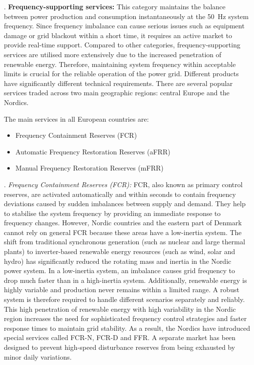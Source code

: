 . \textbf{Frequency-supporting services:} This category maintains the balance between power production and consumption instantaneously at the 50~Hz system frequency. Since frequency imbalance can cause serious issues such as equipment damage or grid blackout within a short time, it requires an active market to provide real-time support. Compared to other categories, frequency-supporting services are utilised more extensively due to the increased penetration of renewable energy. Therefore, maintaining system frequency within acceptable limits is crucial for the reliable operation of the power grid. Different products have significantly different technical requirements. There are several popular services traded across two main geographic regions: central Europe and the Nordics.

The main services in all European countries are:
    \begin{itemize}
        \item Frequency Containment Reserves (FCR)
        \item Automatic Frequency Restoration Reserves (aFRR)
        \item Manual Frequency Restoration Reserves (mFRR)
    \end{itemize}

    . \textit{Frequency Containment Reserves (FCR):} FCR, also known as primary control reserves, are activated automatically and within seconds to contain frequency deviations caused by sudden imbalances between supply and demand. They help to stabilise the system frequency by providing an immediate response to frequency changes. However, Nordic countries and the eastern part of Denmark cannot rely on general FCR because these areas have a low-inertia system. The shift from traditional synchronous generation (such as nuclear and large thermal plants) to inverter-based renewable energy resources (such as wind, solar and hydro) has significantly reduced the rotating mass and inertia in the Nordic power system. In a low-inertia system, an imbalance causes grid frequency to drop much faster than in a high-inertia system. Additionally, renewable energy is highly variable and production never remains within a limited range. A robust system is therefore required to handle different scenarios separately and reliably. This high penetration of renewable energy with high variability in the Nordic region increases the need for sophisticated frequency control strategies and faster response times to maintain grid stability. As a result, the Nordics have introduced special services called FCR-N, FCR-D and FFR. A separate market has been designed to prevent high-speed disturbance reserves from being exhausted by minor daily variations.

